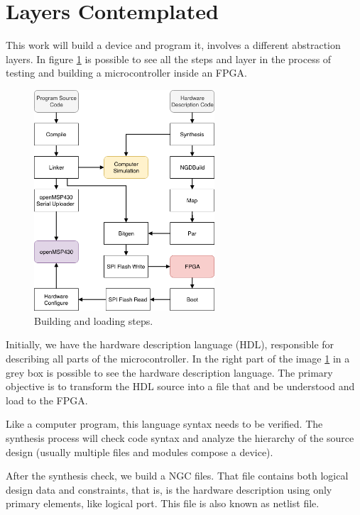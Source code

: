 \section{Layers Contemplated}

This work will build a device and program it, involves a different abstraction layers. In figure \ref{fig:layers} is possible to see all the steps and layer in the process of testing and building a microcontroller inside an FPGA.

\begin{figure}[h]
	\centering
	\includegraphics[width=0.6\textwidth]{figuras/layers}
	\caption{Building and loading steps.}
	\label{fig:layers}
\end{figure}


Initially, we have the hardware description language (HDL), responsible for describing all parts of the microcontroller.  In the right part of the image \ref{fig:layers} in a grey box is possible to see the hardware description language. The primary objective is to transform the  HDL source into a file that and be understood and load to the FPGA.

Like a computer program, this language syntax needs to be verified. The synthesis process will check code syntax and analyze the hierarchy of the source design (usually multiple files and modules compose a device).

After the synthesis check, we build a NGC files. That file contains both logical design data and constraints, that is, is the hardware description using only primary elements, like logical port. This file is also known as netlist file.

